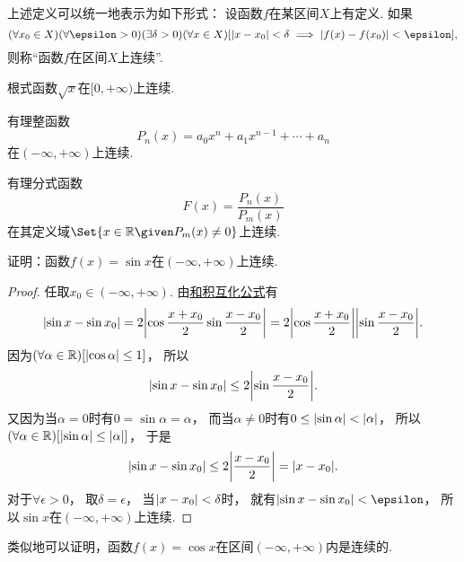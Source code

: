 \begin{remark}
上述定义可以统一地表示为如下形式：
设函数\(f\)在某区间\(X\)上有定义.
如果\[
	(\forall x_0\in X)
	(\forall\epsilon>0)
	(\exists\delta>0)
	(\forall x\in X)
	[
		\abs{x-x_0}<\delta
		\implies
		\abs{f(x)-f(x_0)}<\epsilon
	],
\]
则称“函数\(f\)在区间\(X\)上连续”.
\end{remark}

\begin{example}
根式函数\(\sqrt{x}\)在\([0,+\infty)\)上连续.
\end{example}

\begin{example}
有理整函数\[
	P_n(x) = a_0 x^n + a_1 x^{n-1} + \dotsb + a_n
\]在\((-\infty,+\infty)\)上连续.
\end{example}

\begin{example}
有理分式函数\[
	F(x) = \frac{P_n(x)}{P_m(x)}
\]在其定义域\(\Set{ x\in\mathbb{R} \given P_m(x)\neq0 }\)上连续.
\end{example}

\begin{example}\label{example:极限.正弦函数在实数域上连续}
证明：函数\(f(x) = \sin x\)在\((-\infty,+\infty)\)上连续.
\begin{proof}
任取\(x_0\in(-\infty,+\infty)\).
由\hyperref[equation:函数.三角函数.和积互化公式12]{和积互化公式}有\[
	\abs{\sin x - \sin x_0}
	= 2 \abs{\cos\frac{x+x_0}2 \sin\frac{x-x_0}2}
	= 2 \abs{\cos\frac{x+x_0}2} \abs{\sin\frac{x-x_0}2}.
\]
因为\((\forall\alpha\in\mathbb{R})[\abs{\cos\alpha}\leq1]\)，
所以\[
	\abs{\sin x - \sin x_0} \leq 2 \abs{\sin\frac{x-x_0}2}.
\]
又因为当\(\alpha=0\)时有\(0=\sin\alpha=\alpha\)，
而当\(\alpha\neq0\)时有\(0\leq\abs{\sin\alpha}<\abs{\alpha}\)，
所以\((\forall\alpha\in\mathbb{R})[\abs{\sin\alpha}\leq\abs{\alpha}]\)，
于是\[
	\abs{\sin x - \sin x_0}
	\leq 2 \abs{\frac{x-x_0}2}
	= \abs{x-x_0}.
\]
对于\(\forall\epsilon>0\)，
取\(\delta=\epsilon\)，
当\(\abs{x-x_0}<\delta\)时，
就有\(\abs{\sin x-\sin x_0}<\epsilon\)，
所以\(\sin x\)在\((-\infty,+\infty)\)上连续.
\end{proof}
\end{example}

类似地可以证明，函数\(f(x) = \cos x\)在区间\((-\infty,+\infty)\)内是连续的.


